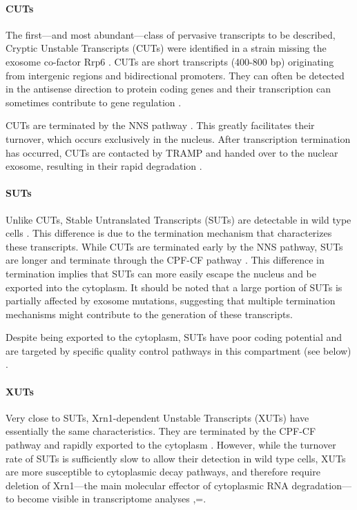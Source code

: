 \paragraph{CUTs}

The first—and most abundant—class of pervasive transcripts to be described, Cryptic Unstable Transcripts (CUTs) were identified in a strain missing the exosome co-factor Rrp6 \cite{wyers:2005:cryptic}. 
CUTs are short transcripts (400-800 bp) originating from intergenic regions and bidirectional promoters.
They can often be detected in the antisense direction to protein coding genes and their transcription can sometimes contribute to gene regulation \cite{arigo:2006:termination}. 

CUTs are terminated by the NNS pathway \cite{arigo:2006:regulation}. 
This greatly facilitates their turnover, which occurs exclusively in the nucleus. 
After transcription termination has occurred, CUTs are contacted by TRAMP and handed over to the nuclear exosome, resulting in their rapid degradation \cite{thiebaut:2006:transcription}.

\paragraph{SUTs}

Unlike CUTs, Stable Untranslated Transcripts (SUTs) are detectable in wild type cells \cite{david:2006:highresolution}. 
This difference is due to the termination mechanism that characterizes these transcripts. While CUTs are terminated early by the NNS pathway, SUTs are longer and terminate through the CPF-CF pathway \cite{marquardt:2011:distinct}. 
This difference in termination implies that SUTs can more easily escape the nucleus and be exported into the cytoplasm. 
It should be noted that a large portion of SUTs is partially affected by exosome mutations, suggesting that multiple termination mechanisms might contribute to the generation of these transcripts. 

Despite being exported to the cytoplasm, SUTs have poor coding potential and are targeted by specific quality control pathways in this compartment (see below) \cite{malabat:2015:quality}.

\paragraph{XUTs}

Very close to SUTs, Xrn1-dependent Unstable Transcripts (XUTs) have essentially the same characteristics.
They are terminated by the CPF-CF pathway and rapidly exported to the cytoplasm \cite{vandijk:2011:xuts}. 
However, while the turnover rate of SUTs is sufficiently slow to allow their detection in wild type cells, XUTs are more susceptible to cytoplasmic decay pathways, and therefore require deletion of Xrn1—the main molecular effector of cytoplasmic RNA degradation—to become visible in transcriptome analyses \cite{vandijk:2011:xuts},=.


